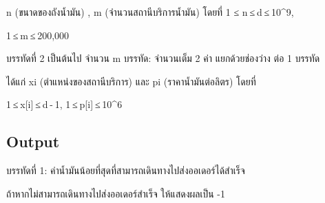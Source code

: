 \documentclass{article}
\begin{document}
n (ขนาดของถังน้ำมัน) , m (จำนวนสถานีบริการน้ำมัน) โดยที่ 1 ≤ n ≤ d ≤ 10\^{}9,

1 ≤ m ≤ 200,000



บรรทัดที่ 2 เป็นต้นไป จำนวน m บรรทัด: จำนวนเต็ม 2 ค่า แยกด้วยช่องว่าง ต่อ 1 บรรทัด

ได้แก่ xi (ตำแหน่งของสถานีบริการ) และ pi (ราคาน้ำมันต่อลิตร) โดยที่

1 ≤ x{[}i{]} ≤ d - 1, 1 ≤ p{[}i{]} ≤ 10\^{}6



\subsection*{Output}
บรรทัดที่ 1: ค่าน้ำมันน้อยที่สุดที่สามารถเดินทางไปส่งออเดอร์ได้สำเร็จ

ถ้าหากไม่สามารถเดินทางไปส่งออเดอร์สำเร็จ ให้แสดงผลเป็น -1\\
\end{document}
